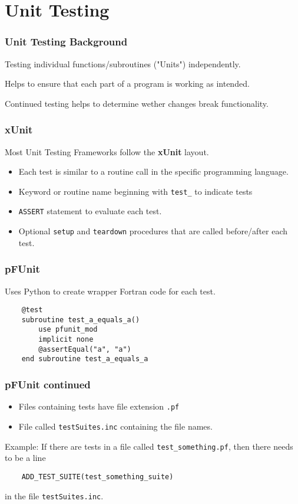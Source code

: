 \section{Unit Testing}

\begin{frame}
    \frametitle{Unit Testing Background}
    Testing individual functions/subroutines ("Units") independently.

    Helps to ensure that each part of a program is working as intended.

    Continued testing helps to determine wether changes break functionality.
\end{frame}

\begin{frame}
    \frametitle{xUnit}
    Most Unit Testing Frameworks follow the \textbf{xUnit} layout.

    \begin{itemize}
        \item Each test is similar to a routine call in the specific programming language.
        \item Keyword or routine name beginning with \texttt{test\_} to indicate tests
        \item \texttt{ASSERT} statement to evaluate each test.
        \item Optional \texttt{setup} and \texttt{teardown} procedures that are called
            before/after each test.
    \end{itemize}
\end{frame}

\begin{frame}[fragile]
    \frametitle{pFUnit}
    Uses Python to create wrapper Fortran code for each test.

    \begin{lstlisting}
    @test
    subroutine test_a_equals_a()
        use pfunit_mod
        implicit none
        @assertEqual("a", "a")
    end subroutine test_a_equals_a
    \end{lstlisting}
\end{frame}

\begin{frame}[fragile]
    \frametitle{pFUnit continued}
    \begin{itemize}
        \item Files containing tests have file extension \texttt{.pf}
        \item File called \texttt{testSuites.inc} containing the file names.
    \end{itemize}
    Example:
    If there are tests in a file called \texttt{test\_something.pf}, then there needs to be a line 
    \begin{lstlisting}
    ADD_TEST_SUITE(test_something_suite)
    \end{lstlisting}
    in the file \texttt{testSuites.inc}.
\end{frame}


